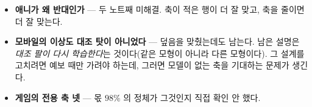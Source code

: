 \documentclass[11pt]{article}
\begin{document}
\begin{itemize}
\item \textbf{애니가 왜 반대인가} --- 두 노트째 미해결. 축이 적은 행이
더 잘 맞고, 축을 줄이면 더 잘 맞는다.
\item \textbf{모바일의 이상도 대조 탓이 아니었다} --- 덮음을 맞췄는데도
남는다. 남은 설명은 \emph{대조 팔이 다시 학습한다}는 것이다(같은 모형이
아니라 다른 모형이다). 그 설계를 고치려면 예보 때만 가려야 하는데,
그러면 모델이 없는 축을 기대하는 문제가 생긴다.
\item \textbf{게임의 전용 축 넷} --- 몫 $98\%$ 의 정체가 그것인지 직접
확인 안 했다.
\end{itemize}
\end{document}
